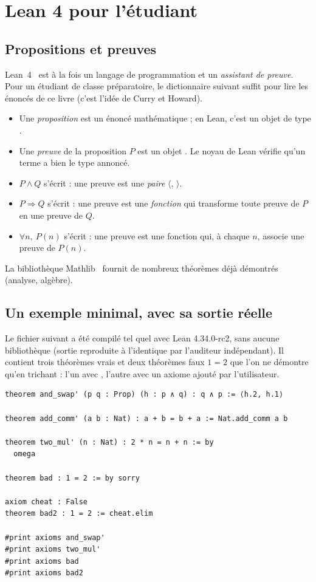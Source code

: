 \section{Lean 4 pour l'étudiant}
\label{ch1:sec:lean}

\subsection{Propositions et preuves}

Lean~4~\cite{lean4} est à la fois un langage de programmation et un \emph{assistant de preuve}. Pour un étudiant de classe préparatoire,
le dictionnaire suivant suffit pour lire les énoncés de ce livre (c'est l'idée de Curry et Howard).
\begin{itemize}
\item Une \emph{proposition} est un énoncé mathématique ; en Lean, c'est un objet de type .
\item Une \emph{preuve} de la proposition $P$ est un objet . Le noyau de Lean vérifie qu'un terme a bien le type annoncé.
\item $P\wedge Q$ s'écrit  : une preuve est une \emph{paire} $\langle$, $\rangle$.
\item $P\Rightarrow Q$ s'écrit  : une preuve est une \emph{fonction} qui transforme toute preuve de $P$ en une preuve de $Q$.
\item $\forall n,\ P(n)$ s'écrit  : une preuve est une fonction qui, à chaque $n$, associe une preuve de $P(n)$.
\end{itemize}
La bibliothèque Mathlib~\cite{mathlib} fournit de nombreux théorèmes déjà démontrés (analyse, algèbre).

\subsection{Un exemple minimal, avec sa sortie réelle}

Le fichier suivant a été compilé tel quel avec Lean 4.34.0-rc2, sans aucune bibliothèque (sortie reproduite à l'identique par l'auditeur indépendant). Il contient trois théorèmes vrais et deux \og théorèmes \fg{}
faux $1=2$ que l'on ne démontre qu'en trichant : l'un avec , l'autre avec un axiome ajouté par l'utilisateur.

\begin{leanbox}
\begin{lstlisting}[language=Lean]
theorem and_swap' (p q : Prop) (h : p ∧ q) : q ∧ p := ⟨h.2, h.1⟩

theorem add_comm' (a b : Nat) : a + b = b + a := Nat.add_comm a b

theorem two_mul' (n : Nat) : 2 * n = n + n := by
  omega

theorem bad : 1 = 2 := by sorry

axiom cheat : False
theorem bad2 : 1 = 2 := cheat.elim

#print axioms and_swap'
#print axioms two_mul'
#print axioms bad
#print axioms bad2
\end{lstlisting}
\end{leanbox}

